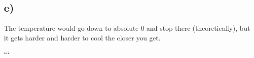 

\subsection*{e)}

The temperature would go down to absolute 0 and stop there (theoretically), but it gets harder and harder to cool the closer you get.

```